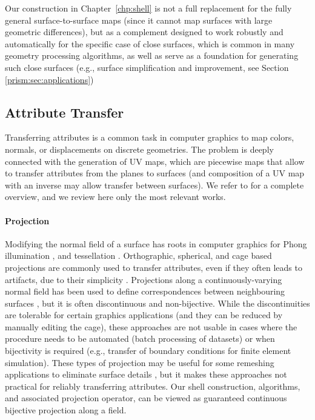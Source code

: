  Our construction in Chapter~\ref{chp:shell} is not a full replacement for the fully general surface-to-surface maps (since it cannot map surfaces with large geometric differences), but as a complement designed to work robustly and automatically for the specific case of close surfaces, which is common in many geometry processing algorithms, as well as serve as a foundation for generating such close surfaces (e.g., surface simplification and improvement, see Section \ref{prism:sec:applications})


\subsection{Attribute Transfer}
\label{prism:sec:rel:transfer}

Transferring attributes is a common task in computer graphics to map colors, normals, or displacements on discrete geometries. 
The problem is deeply connected with the generation of UV maps, which are piecewise maps that allow to transfer attributes from the planes to surfaces (and composition of a UV map with an inverse may allow transfer between surfaces).  We refer to \cite{FloaterSurvey:2005,Sheffer:2006,Hormann:2007} for a complete overview, and we review here only the most relevant works.

\paragraph{Projection} 
Modifying the normal field of a surface has roots in computer graphics for Phong illumination \cite{phong1975illumination}, and tessellation \cite{boubekeur2008phong}.  Orthographic, spherical, and cage based projections are commonly used to transfer attributes, even if they often leads to artifacts, due to their simplicity {\cite{blender,nguyen2007gpu}}. 
Projections along a continuously-varying normal field has been used to define correspondences between neighbouring surfaces \cite{kobbelt1998interactive,lee2000displaced,panozzo2013weighted,Ezuz:2019}, but it is often discontinuous and non-bijective. While the discontinuities are tolerable for certain graphics applications (and they can be reduced by manually editing the cage), these approaches are not usable in cases where the procedure needs to be automated (batch processing of datasets) or when bijectivity is required (e.g., transfer of boundary conditions for finite element simulation).  These types of projection may be useful for some remeshing applications to eliminate surface details \cite{ebke2014level}, but it makes these approaches not practical for reliably transferring attributes. Our shell construction, algorithms, and associated projection operator, can be viewed as guaranteed continuous bijective  projection along a field. 


